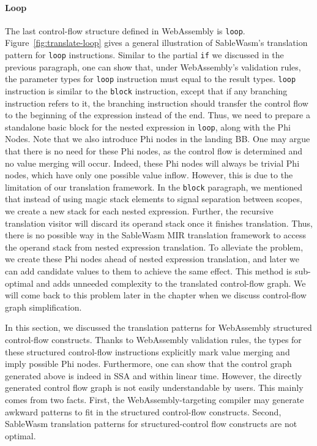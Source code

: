 \paragraph{Loop}
The last control-flow structure defined in WebAssembly is \texttt{loop}. Figure~\ref{fig:translate-loop} gives a general illustration of SableWasm's translation pattern for \texttt{loop} instructions. Similar to the partial \texttt{if} we discussed in the previous paragraph, one can show that, under WebAssembly's validation rules, the parameter types for \texttt{loop} instruction must equal to the result types. \texttt{loop} instruction is similar to the \texttt{block} instruction, except that if any branching instruction refers to it, the branching instruction should transfer the control flow to the beginning of the expression instead of the end. Thus, we need to prepare a standalone basic block for the nested expression in \texttt{loop}, along with the Phi Nodes. Note that we also introduce Phi nodes in the landing BB. One may argue that there is no need for these Phi nodes, as the control flow is determined and no value merging will occur. Indeed, these Phi nodes will always be trivial Phi nodes, which have only one possible value inflow. However, this is due to the limitation of our translation framework. In the \texttt{block} paragraph, we mentioned that instead of using magic stack elements to signal separation between scopes, we create a new stack for each nested expression. Further, the recursive translation visitor will discard its operand stack once it finishes translation. Thus, there is no possible way in the SableWasm MIR translation framework to access the operand stack from nested expression translation. To alleviate the problem, we create these Phi nodes ahead of nested expression translation, and later we can add candidate values to them to achieve the same effect. This method is sub-optimal and adds unneeded complexity to the translated control-flow graph. We will come back to this problem later in the chapter when we discuss control-flow graph simplification.

In this section, we discussed the translation patterns for WebAssembly structured control-flow constructs. Thanks to WebAssembly validation rules, the types for these structured control-flow instructions explicitly mark value merging and imply possible Phi nodes. Furthermore, one can show that the control graph generated above is indeed in SSA and within linear time. However, the directly generated control flow graph is not easily understandable by users. This mainly comes from two facts. First, the WebAssembly-targeting compiler may generate awkward patterns to fit in the structured control-flow constructs. Second, SableWasm translation patterns for structured-control flow constructs are not optimal.